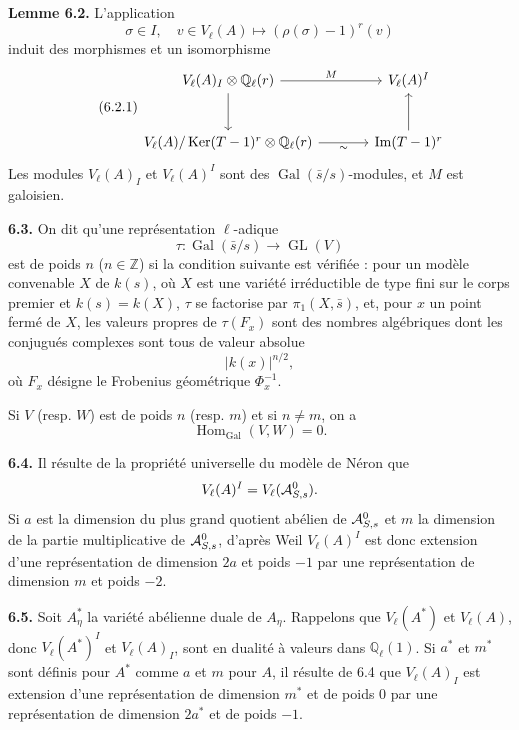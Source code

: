 \documentclass[11pt]{article}
\providecommand{\Gal}{\operatorname{Gal}}
\providecommand{\GL}{\operatorname{GL}}
\providecommand{\Ker}{\operatorname{Ker}}
\providecommand{\Ql}{\mathbb Q_\ell}
\providecommand{\Hom}{\operatorname{Hom}}
\begin{document}
\textbf{Lemme 6.2.} L'application
\[
 \sigma\in I,
 \quad v\in V_\ell(A)
 \longmapsto (\rho(\sigma)-1)^r(v)
\]
induit des morphismes et un isomorphisme
\begin{equation}\qquad\text{(6.2.1)}
\begin{tikzcd}[column sep=large,row sep=large]
 V_\ell(A)_I\otimes\Ql(r) \arrow[r,"M"] \arrow[d]
 & V_\ell(A)^I \\
 V_\ell(A)/\Ker(T-1)^r\otimes\Ql(r) \arrow[r,"\sim"']
 & \Ima(T-1)^r \arrow[u]
\end{tikzcd}
\end{equation}
Les modules $V_\ell(A)_I$ et $V_\ell(A)^I$ sont des $\Gal(\bar s/s)$-modules, et $M$ est galoisien.

\textbf{6.3.} On dit qu'une représentation $\ell$-adique
\[
 \tau:\Gal(\bar s/s)\longrightarrow \GL(V)
\]
est de poids $n$ ($n\in\mathbb Z$) si la condition suivante est vérifiée : pour un modèle convenable $X$ de $k(s)$, où $X$ est une variété irréductible de type fini sur le corps premier et $k(s)=k(X)$, $\tau$ se factorise par $\pi_1(X,\bar s)$, et, pour $x$ un point fermé de $X$, les valeurs propres de $\tau(F_x)$ sont des nombres algébriques dont les conjugués complexes sont tous de valeur absolue
\[
 |k(x)|^{n/2},
\]
où $F_x$ désigne le Frobenius géométrique $\Phi_x^{-1}$.

Si $V$ (resp. $W$) est de poids $n$ (resp. $m$) et si $n\ne m$, on a
\[
 \Hom_{\Gal}(V,W)=0.
\]

\textbf{6.4.} Il résulte de la propriété universelle du modèle de Néron que
\[
 V_\ell(A)^I=V_\ell(\mathcal A^0_{S,s}).
\]
Si $a$ est la dimension du plus grand quotient abélien de $\mathcal A^0_{S,s}$ et $m$ la dimension de la partie multiplicative de $\mathcal A^0_{S,s}$, d'après Weil $V_\ell(A)^I$ est donc extension d'une représentation de dimension $2a$ et poids $-1$ par une représentation de dimension $m$ et poids $-2$.

\textbf{6.5.} Soit $A_\eta^*$ la variété abélienne duale de $A_\eta$. Rappelons que $V_\ell(A^*)$ et $V_\ell(A)$, donc $V_\ell(A^*)^I$ et $V_\ell(A)_I$, sont en dualité à valeurs dans $\Ql(1)$. Si $a^*$ et $m^*$ sont définis pour $A^*$ comme $a$ et $m$ pour $A$, il résulte de 6.4 que $V_\ell(A)_I$ est extension d'une représentation de dimension $m^*$ et de poids $0$ par une représentation de dimension $2a^*$ et de poids $-1$.
\end{document}
